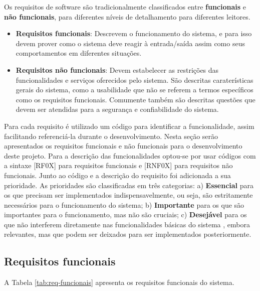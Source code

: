 Os requisitos de software são tradicionalmente classificados entre \textbf{funcionais} e \textbf{não funcionais}, para diferentes níveis de detalhamento para diferentes leitores.

\begin{itemize}
	\item{\textbf{Requisitos funcionais}: Descrevem o funcionamento do sistema, e para isso devem prover como o sistema deve reagir à entrada/saída assim como seus comportamentos em diferentes situações.}
	
	\item{\textbf{Requisitos não funcionais}: Devem estabelecer as restrições das funcionalidades e serviços oferecidos pelo sistema. São descritas caraterísticas gerais do sistema, como a usabilidade que não se referem a termos específicos como os requisitos funcionais. Comumente também são descritas questões que devem ser atendidas para a segurança e confiabilidade do sistema.}
\end{itemize}

Para cada requisito é utilizado um código para identificar a funcionalidade, assim facilitando referenciá-la durante o desenvolvimento. Nesta seção serão apresentados os requisitos funcionais e não funcionais para o desenvolvimento deste projeto. Para a descrição das funcionalidades optou-se por usar códigos com a sintaxe [RF0X] para requisitos funcionais e [RNF0X] para requisitos não funcionais. Junto ao código e a descrição do requisito foi adicionada a sua prioridade. As prioridades são classificadas em três categorias: a) \textbf{Essencial} para os que precisam ser implementados indispensavelmente, ou seja, são estritamente necessários para o funcionamento do sistema; b) \textbf{Importante} para os que são importantes para o funcionamento, mas não são cruciais; c) \textbf{Desejável} para os que não interferem diretamente nas funcionalidades básicas do sistema , embora relevantes, mas que podem ser deixados para ser implementados posteriormente.

\subsection{Requisitos funcionais}

A Tabela \ref{tab:req-funcionais} apresenta os requisitos funcionais do sistema.

